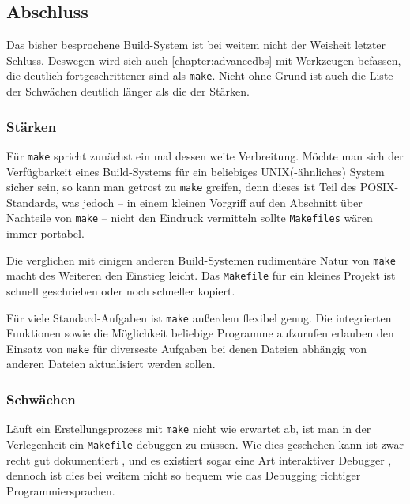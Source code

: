 \subsection{Abschluss}

Das bisher besprochene Build-System ist bei weitem nicht der Weisheit letzter
Schluss. Deswegen wird sich auch \autoref{chapter:advancedbs} mit
Werkzeugen befassen, die deutlich fortgeschrittener sind als \texttt{make}.
Nicht ohne Grund ist auch die Liste der Schwächen deutlich länger als die der
Stärken.

\subsubsection{Stärken}

Für \texttt{make} spricht zunächst ein mal dessen weite Verbreitung. Möchte man
sich der Verfügbarkeit eines Build-Systems für ein beliebiges UNIX(-ähnliches)
System sicher sein, so kann man getrost zu \texttt{make} greifen, denn dieses
ist Teil des POSIX-Standards, was jedoch -- in einem kleinen Vorgriff auf den
Abschnitt über Nachteile von \texttt{make} -- nicht den Eindruck vermitteln
sollte \texttt{Makefiles} wären immer portabel.

Die verglichen mit einigen anderen Build-Systemen rudimentäre Natur von
\texttt{make} macht des Weiteren den Einstieg leicht. Das \texttt{Makefile} für
ein kleines Projekt ist schnell geschrieben oder noch schneller kopiert.

Für viele Standard-Aufgaben ist \texttt{make} außerdem flexibel genug. Die
integrierten Funktionen sowie die Möglichkeit beliebige Programme aufzurufen
erlauben den Einsatz von \texttt{make} für diverseste Aufgaben bei denen Dateien
abhängig von anderen Dateien aktualisiert werden sollen.

\subsubsection{Schwächen} 

Läuft ein Erstellungsprozess mit \texttt{make} nicht wie erwartet ab, ist man in
der Verlegenheit ein \texttt{Makefile} debuggen zu müssen. Wie dies geschehen
kann ist zwar recht gut dokumentiert ,
und es existiert sogar eine Art interaktiver Debugger ,
dennoch ist dies bei weitem nicht so bequem wie das Debugging richtiger
Programmiersprachen.

